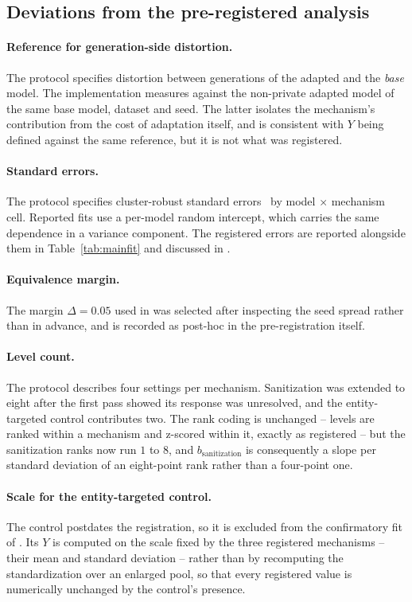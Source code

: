\subsection{\label{apx:deviations}Deviations from the pre-registered analysis}
\paragraph{Reference for generation-side distortion.}
The protocol specifies distortion between generations of the adapted and the \textit{base} model.
The implementation measures against the non-private adapted model of the same base model,
dataset and seed.
The latter isolates the mechanism's contribution from the cost of adaptation itself,
and is consistent with $Y$ being defined against the same reference,
but it is not what was registered.

\paragraph{Standard errors.}
The protocol specifies cluster-robust standard errors~\citep{cameron2015practitioner} by model $\times$ mechanism cell.
Reported fits use a per-model random intercept,
which carries the same dependence in a variance component.
The registered errors are reported alongside them in Table~\ref{tab:mainfit} and discussed in .

\paragraph{Equivalence margin.}
The margin $\Delta = 0.05$ used in  was selected after inspecting the seed spread rather than in advance,
and is recorded as post-hoc in the pre-registration itself.

\paragraph{Level count.}
The protocol describes four settings per mechanism.
Sanitization was extended to eight after the first pass showed its response was unresolved,
and the entity-targeted control contributes two.
The rank coding is unchanged -- levels are ranked within a mechanism and z-scored within it,
exactly as registered -- but the sanitization ranks now run $1$ to $8$,
and $b_{\text{sanitization}}$ is consequently a slope per standard deviation of an eight-point rank rather than a four-point one.

\paragraph{Scale for the entity-targeted control.}
The control postdates the registration,
so it is excluded from the confirmatory fit of .
Its $Y$ is computed on the scale fixed by the three registered mechanisms -- their mean and standard deviation -- rather than by recomputing the standardization over an enlarged pool,
so that every registered value is numerically unchanged by the control's presence.

